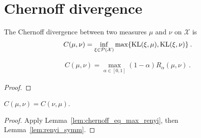 \chapter{Chernoff divergence}

\begin{definition}
  \label{def:Chernoff}
    The Chernoff divergence between two measures $\mu$ and $\nu$ on $\mathcal X$ is
  \begin{align*}
    C(\mu, \nu) = \inf_{\xi \in \mathcal P(\mathcal X)}\max\{\mathrm{KL}(\xi, \mu), \mathrm{KL}(\xi, \nu)\} \: .
  \end{align*}
\end{definition}

\begin{lemma}
  \label{lem:chernoff_eq_max_renyi}
  \begin{align*}
  C(\mu, \nu) = \max_{\alpha\in [0,1]} (1 - \alpha)R_\alpha(\mu, \nu) \: .
  \end{align*}
\end{lemma}

\begin{proof}
\end{proof}

\begin{lemma}
  \label{lem:chernoff_symm}
  $C(\mu, \nu) = C(\nu, \mu)$.
\end{lemma}

\begin{proof}
Apply Lemma~\ref{lem:chernoff_eq_max_renyi}, then Lemma~\ref{lem:renyi_symm}.
\end{proof}

